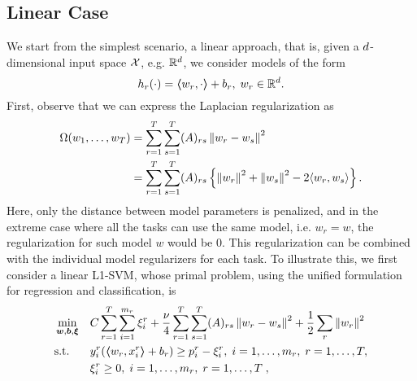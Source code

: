 \subsection{Linear Case}
We start from the simplest scenario, a linear approach, that is, given a $d$-dimensional input space $\mathcal{X}$, e.g. $\mathbb{R}^d$, we consider models of the form
$$ h_r(\cdot) = \bm{\left\langle} w_r, \cdot \bm{\right\rangle} + b_r,\;  w_r \in \mathbb{R}^d .$$
First, observe that we can express the Laplacian regularization as
\begin{equation}
    \nonumber
    \begin{aligned}
        \Omega(w_1, \ldots, w_T) &= \sum_{r=1}^T \sum_{s=1}^T (A)_{rs} \left\lVert w_r - w_s\right\rVert^2 \\
        &=  \sum_{r=1}^T \sum_{s=1}^T (A)_{rs} \left\{ \left\lVert w_r\right\rVert^2 + \left\lVert w_s\right\rVert^2 - 2 \langle w_r, w_s \rangle \right\}.
    \end{aligned}
\end{equation}
Here, only the distance between model parameters is penalized, and in the extreme case where all the tasks can use the same model, i.e. $w_r = w$, the regularization for such model $w$ would be $0$.
This regularization can be combined with the individual model regularizers for each task.
To illustrate this, we first consider a linear L1-SVM, whose primal problem, using the unified formulation for regression and classification, is
\begin{equation}\label{eq:linear_gl_primal}
    \begin{aligned}
         & \min_{\fv{w}, \fv{b}, \fv{\xi}}
         &                                    & {C \sum_{r=1}^T \sum_{i=1}^{\npertask_r}{\xi_{i}^r} + \frac{\nu}{4} \sum_{r=1}^T \sum_{s=1}^T (A)_{rs} \norm{w_r - w_s}^2 + \frac{1}{2} \sum_r \norm{w_r}^2 }                                                               \\
         & \text{s.t.}
         &                                    & y_{i}^r ( \dotp{w_r}{x_{i}^r} + b_r) \geq p_{i}^r - \xi_{i}^r , \;  i=1,\ldots,m_r, \;  r=1,\ldots,T,                                                                                                           \\
         &                                    &                                                                                                                                                 & \xi_{i}^r \geq 0, \;  i=1,\ldots,m_r, \;  r=1,\ldots,T \; ,
    \end{aligned}
\end{equation}
